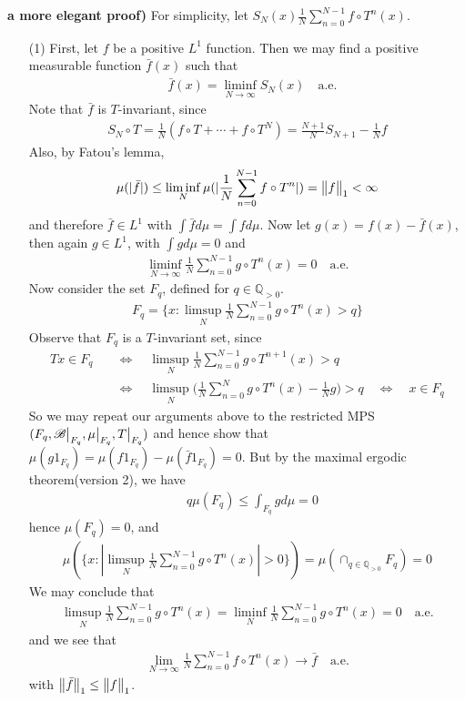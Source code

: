 \documentclass[12pt,a4paper]{report}
\newenvironment{proof}
{\begin{changemargin}{1cm}{0.5cm} 
	}%
	{\end{changemargin}
}
\begin{document}
\begin{proof}
\textbf{a more elegant proof) }
For simplicity, let $S_N(x) \frac{1}{N} \sum_{n=0}^{N-1} f\circ T^n (x)$.
\begin{itemize}
\item[(1)] First, let $f$ be a positive $L^1$ function. Then we may find a positive measurable function $\bar{f}(x)$  such that
\begin{align*}
&\bar{f}(x) = \liminf_{N\rightarrow \infty} S_N(x) \quad \text{a.e.}
\end{align*}
Note that $\bar{f}$ is $T$-invariant, since
\begin{align*}
S_N \circ T = \frac{1}{N}(f\circ T + \cdots + f\circ T^N) = \frac{N+1}{N} S_{N+1} - \frac{1}{N} f
\end{align*} 
Also, by Fatou's lemma,
\begin{align*}
\mu (| \bar{f} |) \leq \liminf_{N} \mu(| \frac{1}{N} \sum_{n=0}^{N-1} f\circ T^n |) = \bigl\lVert f\bigr\rVert_{1} <\infty  
\end{align*}
and therefore $\bar{f} \in L^1$ with $\int \bar{f} d\mu = \int fd\mu$. Now let $g(x) = f(x) - \bar{f}(x)$, then again $g\in L^1$, with $\int g d\mu = 0$ and 
\begin{align*}
\liminf_{N\rightarrow \infty} \frac{1}{N} \sum_{n=0}^{N-1} g\circ T^n (x) =0 \quad \text{a.e.}
\end{align*}
Now consider the set $F_q$, defined for $q\in \mathbb{Q}_{>0}$.
\begin{align*}
F_q = \{  x: \limsup_N  \frac{1}{N} \sum_{n=0}^{N-1} g \circ T^n (x) > q   \}
\end{align*}
Observe that $F_q$ is a $T$-invariant set, since
\begin{align*}
Tx \in F_q \quad &\Leftrightarrow \quad \limsup_{N} \frac{1}{N} \sum_{n=0}^{N-1} g\circ T^{n+1}(x) > q \\
&\Leftrightarrow \quad \limsup_{N} \Big( \frac{1}{N} \sum_{n=0}^{N} g\circ T^{n}(x) -\frac{1}{N} g \Big) > q \quad \Leftrightarrow \quad x\in F_q
\end{align*}
So we may repeat our arguments above to the restricted MPS $(F_q, \mathscr{B} \big|_{F_q}, \mu\big|_{F_q}, T\big|_{F_q})$ and hence show that $\mu(g 1_{F_q}) = \mu(f 1_{F_q}) - \mu(\bar{f} 1_{F_q}) =0$. But by the maximal ergodic theorem(version 2), we have
\begin{align*}
& q \mu(F_q) \leq  \int_{F_q} g d\mu =0
\end{align*}
hence $\mu(F_q) =0$, and 
\begin{align*}
\mu(\{ x : |\limsup_N  \frac{1}{N} \sum_{n=0}^{N-1} g \circ T^n (x) |>0  \}) = \mu (\cap_{q\in \mathbb{Q}_{>0}} F_q) = 0
\end{align*}
We may conclude that
\begin{align*}
\limsup_N  \frac{1}{N} \sum_{n=0}^{N-1} g \circ T^n (x) = \liminf_N  \frac{1}{N} \sum_{n=0}^{N-1} g \circ T^n (x)  = 0 \quad \text{a.e.}
\end{align*}
and we see that
\begin{align*}
\lim_{N\rightarrow \infty }\frac{1}{N} \sum_{n=0}^{N-1} f \circ T^n (x) \rightarrow \bar{f} \quad \text{a.e.}
\end{align*}
with $\bigl\lVert\bar{f}\bigr\rVert_{1} \leq \bigl\lVert f\bigr\rVert_{1}$.


\end{itemize}
\end{proof}
\end{document}
